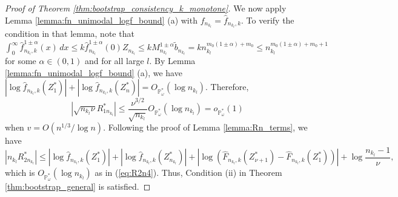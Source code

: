 \documentclass[12pt,letterpaper, twoside, openany]{article}
\theoremstyle{plain}
\begin{document}
\begin{proof}[Proof of Theorem \ref{thm:bootstrap_consistency_k_monotone}]
We now apply Lemma \ref{lemma:fn_unimodal_logf_bound} (a) with $f_{n_{k_l}} = \hat{f}_{n_{k_l},k}$. To verify the condition in that lemma, note that $\int^\infty_0 \hat{f}^{1\pm\alpha}_{n_{k_l},k}(x) \, dx \leq k \hat{f}_{n_{k_l}}^{1\pm\alpha}(0) Z_{n_{k_l}} \leq k M^{1\pm\alpha}_{n_{k_l}} \tilde{b}_{n_{k_l}} = k n_{k_l}^{m_0(1\pm\alpha) + m_0} \leq n_{k_l}^{m_0(1\pm\alpha) + m_0 + 1}$ for some $\alpha \in (0, 1)$ and for all large $l$. By Lemma \ref{lemma:fn_unimodal_logf_bound} (a), we have $|\log \hat{f}_{n_{k_l},k}(Z_1^*)| +  |\log \hat{f}_{n_{k_l},k}(Z_n^*)| = O_{\mathbb{P}^*_\omega}(\log n_{k_l})$.
Therefore, 
\begin{equation*}
    |\sqrt{n_{k_l} \nu} R_{1n_{k_l}}^*| \leq 
    \frac{\nu^{3/2}}{\sqrt{n_{k_l}}}O_{\mathbb{P}^*_\omega}(\log n_{k_l}) = o_{\mathbb{P}^*_\omega}(1)
\end{equation*}
when $v = O(n^{1/3}/\log n)$. Following the proof of Lemma \ref{lemma:Rn_terms}, we have
\begin{equation*}
    |n_{k_l} R^*_{2n_{k_l}}| \leq |\log \hat{f}_{n_{k_l},k}(Z^*_1)| + |\log \hat{f}_{n_{k_l},k}(Z^*_{n_{k_l}})| + |\log(\hat{F}_{n_{k_l},k}(Z_{\nu+1}^*) - 
    \hat{F}_{n_{k_l},k}(Z_{1}^*))| + \log \frac{n_{k_l}-1}{\nu},
\end{equation*}
which is $O_{\mathbb{P}^*_\omega}(\log n_{k_l})$ as in (\ref{eq:R2n4}). Thus, Condition (ii) in Theorem \ref{thm:bootstrap_general} is satisfied.

\end{proof}
\end{document}
